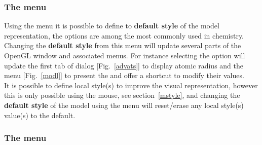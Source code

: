\clearpage
\subsubsection{The  menu}
\label{stylem}

Using the  menu it is possible to define to {\bf{default style}} of the model representation, the options are among the most commonly used in chemistry. 
Changing the {\bf{default style}} from this menu will update several parts of the OpenGL window and associated menus. 
For instance selecting the  option will update the first tab of  dialog [Fig.~\ref{advats}] to display atomic radius 
and the  menu [Fig.~\ref{modl}] to present the  and offer a shortcut to modify their values. \\
It is possible to define local style(s) to improve the visual representation, however this is only possible using the mouse, see section~\ref{mstyle}, 
and changing the {\bf{default style}} of the model using the  menu will reset/erase any local style(s) value(s) to the default. 

\subsubsection{The  menu}
\label{csm}

